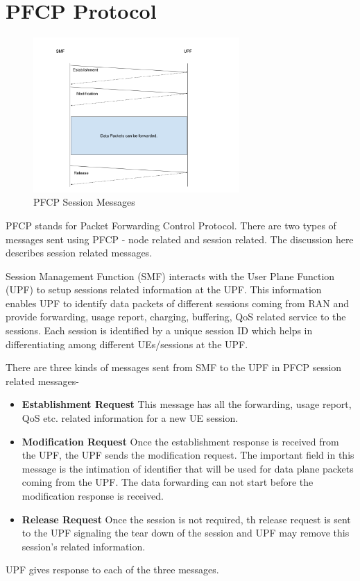 \section {PFCP Protocol\label{sec:PFCP}}
 \begin{figure}[htbp]
    \centering
    \includegraphics[width=0.7\textwidth, keepaspectratio]{./fig/Introduction/PFCP.png}
    \caption{PFCP Session Messages}
    \label{fig:PFCP}
\end{figure}

PFCP stands for Packet Forwarding Control Protocol. 
 There are two types of messages sent using PFCP - node related and session related.
 The discussion here describes session related messages.

 Session Management Function (SMF) interacts with the User Plane Function (UPF) to setup sessions related 
 information at the UPF.
This  information enables UPF to identify data packets of different sessions coming from RAN 
and provide forwarding, usage report, charging, buffering, QoS related service to the sessions.
Each session is identified by a unique session ID which helps in differentiating 
among different UEs/sessions at the UPF. 

There are three kinds of messages sent from SMF to the UPF in PFCP session related messages-
\begin{itemize}
	\item \textbf{Establishment Request} This message has all the forwarding, usage report, QoS etc. related information for  a new UE session.  
	\item \textbf{Modification Request} Once the establishment response is
	received from the UPF, the UPF sends the modification request. The important field in this message is the intimation of identifier that will be used for data plane packets coming from the UPF. The data forwarding can not start before the modification response is received.
	\item \textbf{Release Request} Once the session is not required, th release 
	request is sent to the UPF signaling the tear down of the session and UPF
	 may remove this session's related information.
\end{itemize}
UPF gives response to each of the three messages. 

